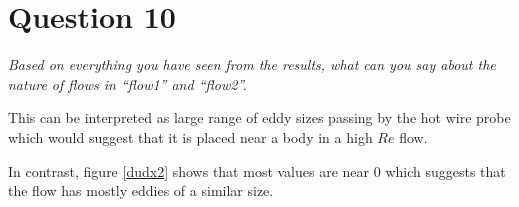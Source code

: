 \section*{Question 10}
\textit{Based on everything you have seen from the results, what can you say about the nature of flows in “flow1” and “flow2”.}

This can be interpreted as large range of eddy sizes passing by the hot wire probe which would suggest that it is placed near a body in a high $Re$ flow.

In contrast, figure \ref{dudx2} shows that most values are near $0$ which suggests that the flow has mostly eddies of a similar size. 
